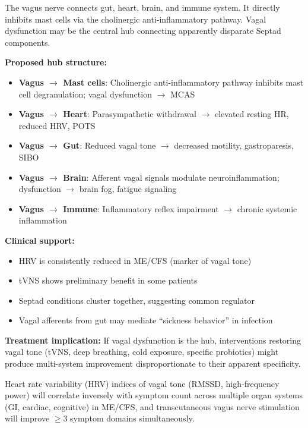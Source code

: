 \begin{hypothesis}
\label{hyp:vagus-hub}
The vagus nerve connects gut, heart, brain, and immune system. It directly inhibits mast cells via the cholinergic anti-inflammatory pathway. Vagal dysfunction may be the central hub connecting apparently disparate Septad components.

\textbf{Proposed hub structure:}
\begin{itemize}
    \item \textbf{Vagus $\rightarrow$ Mast cells}: Cholinergic anti-inflammatory pathway inhibits mast cell degranulation; vagal dysfunction $\rightarrow$ MCAS
    \item \textbf{Vagus $\rightarrow$ Heart}: Parasympathetic withdrawal $\rightarrow$ elevated resting HR, reduced HRV, POTS
    \item \textbf{Vagus $\rightarrow$ Gut}: Reduced vagal tone $\rightarrow$ decreased motility, gastroparesis, SIBO
    \item \textbf{Vagus $\rightarrow$ Brain}: Afferent vagal signals modulate neuroinflammation; dysfunction $\rightarrow$ brain fog, fatigue signaling
    \item \textbf{Vagus $\rightarrow$ Immune}: Inflammatory reflex impairment $\rightarrow$ chronic systemic inflammation
\end{itemize}

\textbf{Clinical support:}
\begin{itemize}
    \item HRV is consistently reduced in ME/CFS (marker of vagal tone)
    \item tVNS shows preliminary benefit in some patients
    \item Septad conditions cluster together, suggesting common regulator
    \item Vagal afferents from gut may mediate ``sickness behavior'' in infection
\end{itemize}

\textbf{Treatment implication:} If vagal dysfunction is the hub, interventions restoring vagal tone (tVNS, deep breathing, cold exposure, specific probiotics) might produce multi-system improvement disproportionate to their apparent specificity.
\end{hypothesis}

\begin{prediction}
\label{pred:vagus-hub}
Heart rate variability (HRV) indices of vagal tone (RMSSD, high-frequency power) will correlate inversely with symptom count across multiple organ systems (GI, cardiac, cognitive) in ME/CFS, and transcutaneous vagus nerve stimulation will improve $\geq$3 symptom domains simultaneously.
\end{prediction}

